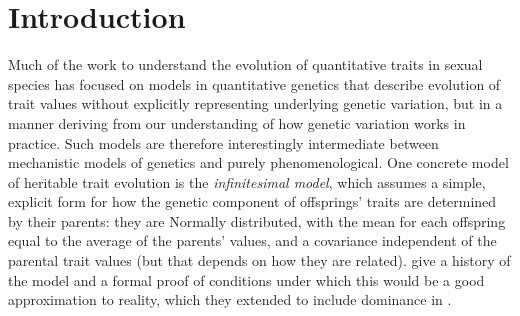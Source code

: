 \documentclass{article}
\newcommand{\1}{\mathbbm{1}}
\theoremstyle{remark}
\theoremstyle{definition}
\begin{document}
\section{Introduction}

Much of the work to 
understand the evolution of quantitative traits in sexual species
has focused on models in quantitative genetics
that describe evolution of trait values without explicitly representing underlying genetic variation,
but in a manner deriving from our understanding of how genetic variation works in practice.
Such models are therefore
interestingly intermediate between mechanistic models of genetics and purely phenomenological.
One concrete model of heritable trait evolution is the \emph{infinitesimal model},
which assumes a simple, explicit form for how the genetic component of offsprings' traits are determined by their parents:
they are Normally distributed, with the mean for each offspring equal to the average of the parents' values,
and a covariance independent of the parental trait values (but that depends on how they are related).
\citet{barton2017infinitesimal} give a history of the model
and a formal proof of conditions under which this would be a good approximation to reality,
which they extended to include dominance in \citet{barton2022infinitesimal}.
\end{document}
